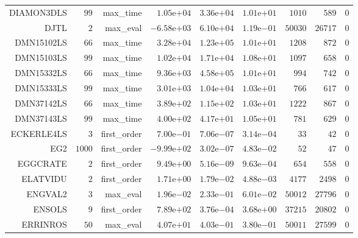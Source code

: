 \begin{longtable}{rrrrrrrrr}
DIAMON3DLS & \(    99\) & max\_time & \( 1.05\)e\(+04\) & \( 3.36\)e\(+04\) & \( 1.01\)e\(+01\) & \(  1010\) & \(   589\) & \(     0\) \\
DJTL & \(     2\) & max\_eval & \(-6.58\)e\(+03\) & \( 6.10\)e\(+04\) & \( 1.19\)e\(-01\) & \( 50030\) & \( 26717\) & \(     0\) \\
DMN15102LS & \(    66\) & max\_time & \( 3.28\)e\(+04\) & \( 1.23\)e\(+05\) & \( 1.01\)e\(+01\) & \(  1208\) & \(   872\) & \(     0\) \\
DMN15103LS & \(    99\) & max\_time & \( 1.02\)e\(+04\) & \( 1.71\)e\(+04\) & \( 1.08\)e\(+01\) & \(  1097\) & \(   658\) & \(     0\) \\
DMN15332LS & \(    66\) & max\_time & \( 9.36\)e\(+03\) & \( 4.58\)e\(+05\) & \( 1.01\)e\(+01\) & \(   994\) & \(   742\) & \(     0\) \\
DMN15333LS & \(    99\) & max\_time & \( 3.01\)e\(+03\) & \( 1.04\)e\(+04\) & \( 1.03\)e\(+01\) & \(   766\) & \(   617\) & \(     0\) \\
DMN37142LS & \(    66\) & max\_time & \( 3.89\)e\(+02\) & \( 1.15\)e\(+02\) & \( 1.03\)e\(+01\) & \(  1222\) & \(   867\) & \(     0\) \\
DMN37143LS & \(    99\) & max\_time & \( 4.00\)e\(+02\) & \( 4.17\)e\(+01\) & \( 1.05\)e\(+01\) & \(   781\) & \(   629\) & \(     0\) \\
ECKERLE4LS & \(     3\) & first\_order & \( 7.00\)e\(-01\) & \( 7.06\)e\(-07\) & \( 3.14\)e\(-04\) & \(    33\) & \(    42\) & \(     0\) \\
EG2 & \(  1000\) & first\_order & \(-9.99\)e\(+02\) & \( 3.02\)e\(-07\) & \( 4.83\)e\(-02\) & \(    52\) & \(    47\) & \(     0\) \\
EGGCRATE & \(     2\) & first\_order & \( 9.49\)e\(+00\) & \( 5.16\)e\(-09\) & \( 9.63\)e\(-04\) & \(   654\) & \(   558\) & \(     0\) \\
ELATVIDU & \(     2\) & first\_order & \( 1.71\)e\(+00\) & \( 1.79\)e\(-02\) & \( 4.88\)e\(-03\) & \(  4177\) & \(  2498\) & \(     0\) \\
ENGVAL2 & \(     3\) & max\_eval & \( 1.96\)e\(-02\) & \( 2.33\)e\(-01\) & \( 6.01\)e\(-02\) & \( 50012\) & \( 27796\) & \(     0\) \\
ENSOLS & \(     9\) & first\_order & \( 7.89\)e\(+02\) & \( 3.76\)e\(-04\) & \( 3.68\)e\(+00\) & \( 37215\) & \( 20802\) & \(     0\) \\
ERRINROS & \(    50\) & max\_eval & \( 4.07\)e\(+01\) & \( 4.03\)e\(-01\) & \( 3.80\)e\(-01\) & \( 50011\) & \( 27599\) & \(     0\) \\

\end{longtable}
